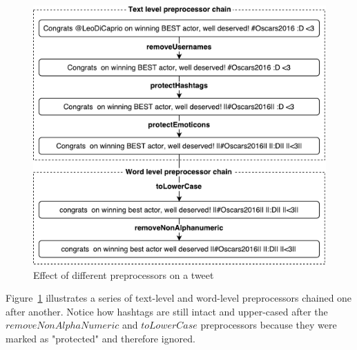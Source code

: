 \begin{figure}[t]
    \centering
    \includegraphics[width=\textwidth]{./figs/chain_preprocessor}
    \caption{Effect of different preprocessors on a tweet}
    \label{fig:chain_preprocessor}
\end{figure}

Figure~\ref{fig:chain_preprocessor} illustrates a series of text-level and word-level preprocessors chained one after another. Notice how hashtags are still intact and upper-cased after the $removeNonAlphaNumeric$ and $toLowerCase$ preprocessors because they were marked as "protected" and therefore ignored. \\

